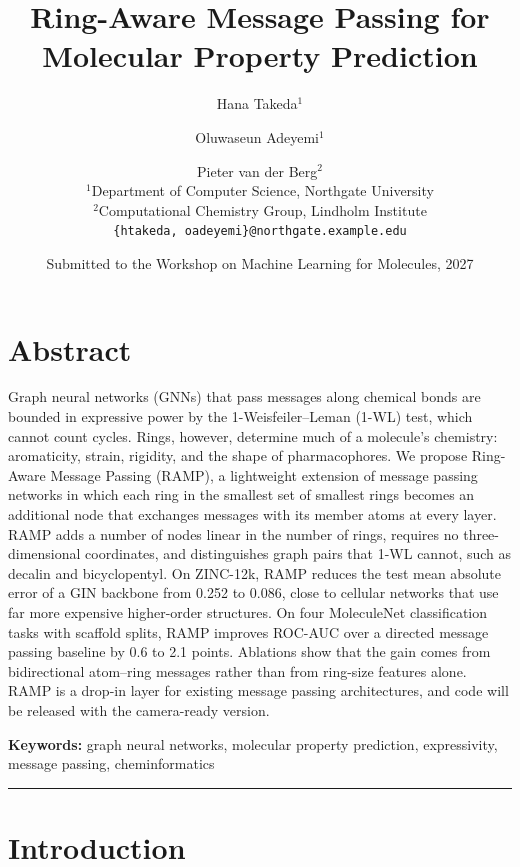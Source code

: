 \documentclass[11pt]{article}
\title{Ring-Aware Message Passing for Molecular Property Prediction}
\author{
  Hana Takeda$^{1}$ \and Oluwaseun Adeyemi$^{1}$ \and Pieter van der Berg$^{2}$\\[4pt]
  \small $^{1}$Department of Computer Science, Northgate University\\
  \small $^{2}$Computational Chemistry Group, Lindholm Institute\\
  \small \texttt{\{htakeda, oadeyemi\}@northgate.example.edu}
}
\date{Submitted to the Workshop on Machine Learning for Molecules, 2027}
\begin{document}
\maketitle

\section*{Abstract}

Graph neural networks (GNNs) that pass messages along chemical bonds are bounded in expressive power by the 1-Weisfeiler--Leman (1-WL) test, which cannot count cycles. Rings, however, determine much of a molecule's chemistry: aromaticity, strain, rigidity, and the shape of pharmacophores. We propose Ring-Aware Message Passing (RAMP), a lightweight extension of message passing networks in which each ring in the smallest set of smallest rings becomes an additional node that exchanges messages with its member atoms at every layer. RAMP adds a number of nodes linear in the number of rings, requires no three-dimensional coordinates, and distinguishes graph pairs that 1-WL cannot, such as decalin and bicyclopentyl. On ZINC-12k, RAMP reduces the test mean absolute error of a GIN backbone from 0.252 to 0.086, close to cellular networks that use far more expensive higher-order structures. On four MoleculeNet classification tasks with scaffold splits, RAMP improves ROC-AUC over a directed message passing baseline by 0.6 to 2.1 points. Ablations show that the gain comes from bidirectional atom--ring messages rather than from ring-size features alone. RAMP is a drop-in layer for existing message passing architectures, and code will be released with the camera-ready version.

\medskip
\noindent\textbf{Keywords:} graph neural networks, molecular property prediction, expressivity, message passing, cheminformatics

\vspace{1em}
\hrule
\vspace{1em}

\section{Introduction}
\end{document}
